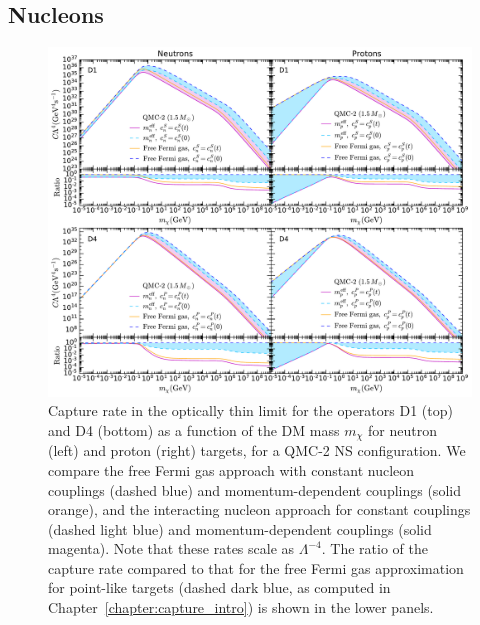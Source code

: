 \subsection{Nucleons}
\label{sec:capresnucleons}

\begin{figure}[t!bp] 
\centering
\includegraphics[width=\textwidth]{capture_3/C_mDM_N_QMC_D1_D4_ratio.pdf}
\caption[Capture rate in the optically thin limit for the operators D1 (top) and D4 (bottom) as a function of the DM mass $m_\chi$ for neutron (left) and proton (right) targets, for a QMC-2 NS configuration.]{
Capture rate in the optically thin limit for the operators D1 (top) and D4 (bottom) as a function of the DM mass $m_\chi$ for neutron (left) and proton (right) targets, for a QMC-2 NS configuration.  We compare the free Fermi gas approach with constant nucleon couplings (dashed blue) and momentum-dependent couplings (solid orange), and the interacting nucleon approach for constant couplings (dashed light blue) and momentum-dependent couplings (solid magenta). Note that these rates scale as $\Lambda^{-4}$. 
The ratio of the capture rate compared to that for the free Fermi gas approximation for point-like targets (dashed dark blue, as computed in Chapter~\ref{chapter:capture_intro}) is shown in the lower panels. 
}
\label{ch5:fig:capratesD1D4}
\end{figure} 

